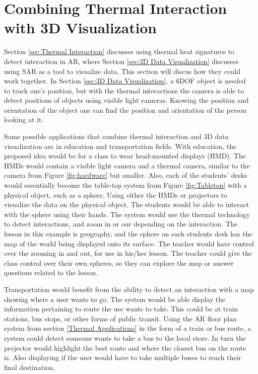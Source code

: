 \documentclass{sig-alternate}
\begin{document}
\section{Combining Thermal Interaction with 3D Visualization}
\label{sec:Joining Together} 
Section \ref{sec:Thermal Interaction} discusses using thermal heat signatures to detect interaction in AR, where Section \ref{sec:3D Data Visualization} discusses using SAR as a tool to visualize data. This section will discus how they could work together. In Section \ref{sec:3D Data Visualization}, a 6DOF object is needed to track one's position, but with the thermal interactions the camera is able to detect positions of objects using visible light cameras. Knowing the position and orientation of the object one can find the position and orientation of the person looking at it.   

Some possible applications that combine thermal interaction and 3D data visualization are in education and transportation fields. With education, the proposed idea would be for a class to wear head-mounted displays (HMD). The HMDs would contain a visible light camera and a thermal camera, similar to the camera from Figure \ref{fig:hardware} but smaller. Also, each of the students' desks would essentially become the table-top system from Figure \ref{fig:Tabletop} with a physical object, such as a sphere. Using either the HMDs or projectors to visualize the data on the physical object. The students would be able to interact with the sphere using their hands. The system would use the thermal technology to detect interactions, and zoom in or our depending on the interaction. The lesson in this example is geography, and the sphere on each students desk has the map of the world being displayed onto its surface. The teacher would have control over the zooming in and out, for use in his/her lesson. The teacher could give the class control over their own spheres, so they can explore the map or answer questions related to the lesson.

Transportation would benefit from the ability to detect an interaction with a map showing where a user wants to go. The system would be able display the information pertaining to route the use wants to take. This could be at train stations, bus stops, or other forms of public transit. Using the AR floor plan system from section \ref{Thermal Applications} in the form of a train or bus route, a system could detect someone wants to take a bus to the local store. In turn the projector would highlight the best route and where the closest bus on the route is. Also displaying if the user would have to take multiple buses to reach their final destination.
\end{document}
